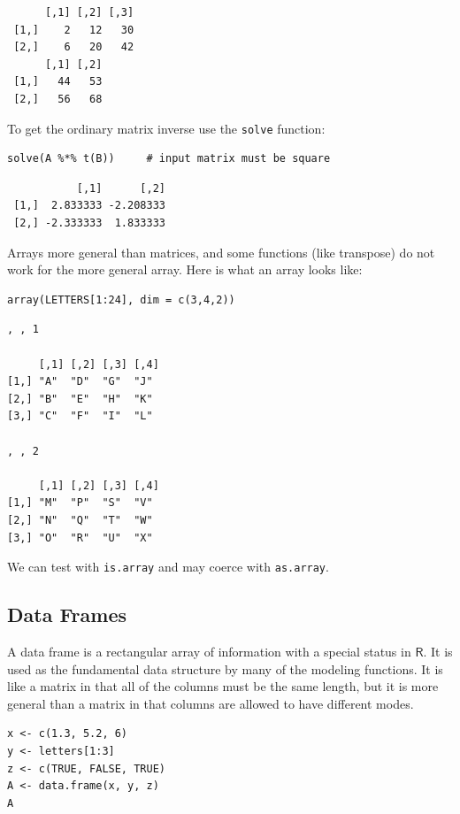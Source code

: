 \documentclass[captions=tableheading]{scrbook}
\begin{document}
\begin{example}
\begin{verbatim}
      [,1] [,2] [,3]
 [1,]    2   12   30
 [2,]    6   20   42
      [,1] [,2]
 [1,]   44   53
 [2,]   56   68
\end{verbatim}

To get the ordinary matrix inverse use the \texttt{solve} function: 


\begin{verbatim}
solve(A %*% t(B))     # input matrix must be square
\end{verbatim}

\begin{verbatim}
           [,1]      [,2]
 [1,]  2.833333 -2.208333
 [2,] -2.333333  1.833333
\end{verbatim}

Arrays more general than matrices, and some functions (like transpose) do not work for the more general array. Here is what an array looks like: 


\begin{verbatim}
array(LETTERS[1:24], dim = c(3,4,2))
\end{verbatim}


\begin{verbatim}
, , 1

     [,1] [,2] [,3] [,4]
[1,] "A"  "D"  "G"  "J" 
[2,] "B"  "E"  "H"  "K" 
[3,] "C"  "F"  "I"  "L" 

, , 2

     [,1] [,2] [,3] [,4]
[1,] "M"  "P"  "S"  "V" 
[2,] "N"  "Q"  "T"  "W" 
[3,] "O"  "R"  "U"  "X"
\end{verbatim}

We can test with \texttt{is.array} and may coerce with \texttt{as.array}.
\subsection{Data Frames}
\label{sec-20-1-3}


A data frame is a rectangular array of information with a special status in \(\mathsf{R}\). It is used as the fundamental data structure by many of the modeling functions. It is like a matrix in that all of the columns must be the same length, but it is more general than a matrix in that columns are allowed to have different modes.


\begin{verbatim}
x <- c(1.3, 5.2, 6)
y <- letters[1:3]
z <- c(TRUE, FALSE, TRUE)
A <- data.frame(x, y, z)
A
\end{verbatim}


\end{example}
\end{document}
